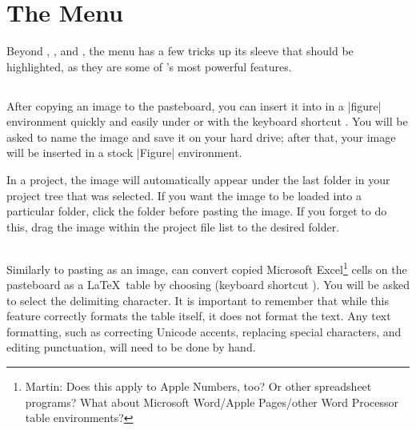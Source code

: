 \section[The Edit Menu]{The  Menu}
\label{reference.editmenu}
Beyond , , and , the  menu has a few tricks up its sleeve that should be highlighted, as they are some of \texnicle's most powerful features.

\subsection[Paste as Image]{}
\label{reference.edit.pasteimg}
After copying an image to the pasteboard, you can insert it into \texnicle in a |figure| environment quickly and easily under  or with the keyboard shortcut . You will be asked to name the image and save it on your hard drive; after that, your image will be inserted in a stock |Figure| environment.

In a project, the image will automatically appear under the last folder in your project tree that was selected. If you want the image to be loaded into a particular folder, click the folder before pasting the image. If you forget to do this, drag the image within the project file list to the desired folder.

\subsection[Paste as Table]{}
\label{reference.edit.pastetab}
Similarly to pasting as an image, \texnicle can convert copied Microsoft Excel\footnote{Martin: Does this apply to Apple Numbers, too? Or other spreadsheet programs? What about Microsoft Word/Apple Pages/other Word Processor table environments?} cells on the pasteboard as a \LaTeX\ table by choosing  (keyboard shortcut ). You will be asked to select the delimiting character. It is important to remember that while this feature correctly formats the table itself, it does not format the text. Any text formatting, such as correcting Unicode accents, replacing special characters, and editing punctuation, will need to be done by hand.



